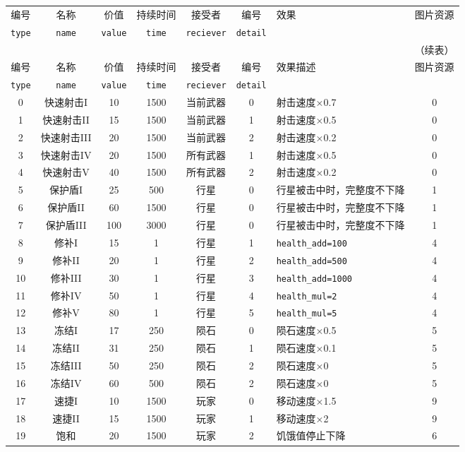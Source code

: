 \documentclass[UTF8,fontset=none,linespread=1.2]{ctexart}
\begin{document}
\begin{center}
\begin{longtable}{|c|c|c|c|c|c|>{\centering\arraybackslash}m{6cm}|c|}
\hline
编号&名称&价值&持续时间&接受者&编号&效果&图片资源\\
\lstinline|type|&\lstinline|name|&\lstinline|value|&\lstinline|time|&\lstinline|reciever|&\lstinline|detail|&&\\\hline
\endfirsthead
\multicolumn{8}{r}{（续表）}\\\hline
编号&名称&价值&持续时间&接受者&编号&效果描述&图片资源\\
\lstinline|type|&\lstinline|name|&\lstinline|value|&\lstinline|time|&\lstinline|reciever|&\lstinline|detail|&&\\\hline
\endhead
0&快速射击I&10&1500&当前武器&0&射击速度×0.7&0\\\hline
1&快速射击II&15&1500&当前武器&1&射击速度×0.5&0\\\hline
2&快速射击III&20&1500&当前武器&2&射击速度×0.2&0\\\hline
3&快速射击IV&20&1500&所有武器&1&射击速度×0.5&0\\\hline
4&快速射击V&40&1500&所有武器&2&射击速度×0.2&0\\\hline
5&保护盾I&25&500&行星&0&行星被击中时，完整度不下降&1\\\hline
6&保护盾II&60&1500&行星&0&行星被击中时，完整度不下降&1\\\hline
7&保护盾III&100&3000&行星&0&行星被击中时，完整度不下降&1\\\hline
8&修补I&15&1&行星&1&\lstinline|health_add=100|&4\\\hline
9&修补II&20&1&行星&2&\lstinline|health_add=500|&4\\\hline
10&修补III&30&1&行星&3&\lstinline|health_add=1000|&4\\\hline
11&修补IV&50&1&行星&4&\lstinline|health_mul=2|&4\\\hline
12&修补V&80&1&行星&5&\lstinline|health_mul=5|&4\\\hline
13&冻结I&17&250&陨石&0&陨石速度×0.5&5\\\hline
14&冻结II&31&250&陨石&1&陨石速度×0.1&5\\\hline
15&冻结III&50&250&陨石&2&陨石速度×0&5\\\hline
16&冻结IV&60&500&陨石&2&陨石速度×0&5\\\hline
17&速捷I&10&1500&玩家&0&移动速度×1.5&9\\\hline
18&速捷II&15&1500&玩家&1&移动速度×2&9\\\hline
19&饱和&20&1500&玩家&2&饥饿值停止下降&6\\\hline

\end{longtable}
\end{center}
\end{document}
